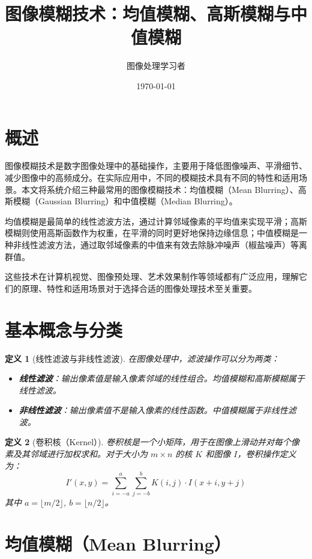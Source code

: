 \documentclass{article}
\title{\textbf{图像模糊技术：均值模糊、高斯模糊与中值模糊}}
\author{图像处理学习者}
\date{\today}
\newtheorem{definition}{定义}[section]
\begin{document}
\maketitle

\tableofcontents
\newpage

\section{概述}
图像模糊技术是数字图像处理中的基础操作，主要用于降低图像噪声、平滑细节、减少图像中的高频成分。在实际应用中，不同的模糊技术具有不同的特性和适用场景。本文将系统介绍三种最常用的图像模糊技术：均值模糊（Mean Blurring）、高斯模糊（Gaussian Blurring）和中值模糊（Median Blurring）。

均值模糊是最简单的线性滤波方法，通过计算邻域像素的平均值来实现平滑；高斯模糊则使用高斯函数作为权重，在平滑的同时更好地保持边缘信息；中值模糊是一种非线性滤波方法，通过取邻域像素的中值来有效去除脉冲噪声（椒盐噪声）等离群值。

这些技术在计算机视觉、图像预处理、艺术效果制作等领域都有广泛应用，理解它们的原理、特性和适用场景对于选择合适的图像处理技术至关重要。

\section{基本概念与分类}

\begin{definition}[线性滤波与非线性滤波]
在图像处理中，滤波操作可以分为两类：
\begin{itemize}
    \item \textbf{线性滤波}：输出像素值是输入像素邻域的线性组合。均值模糊和高斯模糊属于线性滤波。
    \item \textbf{非线性滤波}：输出像素值不是输入像素的线性函数。中值模糊属于非线性滤波。
\end{itemize}
\end{definition}

\begin{definition}[卷积核（Kernel）]
卷积核是一个小矩阵，用于在图像上滑动并对每个像素及其邻域进行加权求和。对于大小为 $m \times n$ 的核 $K$ 和图像 $I$，卷积操作定义为：
\[
I'(x,y) = \sum_{i=-a}^{a} \sum_{j=-b}^{b} K(i,j) \cdot I(x+i, y+j)
\]
其中 $a = \lfloor m/2 \rfloor$, $b = \lfloor n/2 \rfloor$。
\end{definition}

\section{均值模糊（Mean Blurring）}
\end{document}
